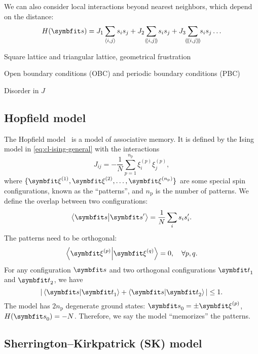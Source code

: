 We can also consider local interactions beyond nearest neighbors, which depend on the distance:
\begin{equation}
H(\vs) = J_1 \sum_{\langle i, j \rangle} s_i s_j + J_2\!\sum_{\llangle i, j \rrangle}\!s_i s_j + J_3\!\!\sum_{\langle\!\langle\!\langle i, j \rangle\!\rangle\!\rangle}\!\!s_i s_j \ldots
\label{eq:cl-ising-nnn}
\end{equation}

Square lattice and triangular lattice, geometrical frustration

Open boundary conditions (OBC) and periodic boundary conditions (PBC)

Disorder in $J$

\subsection{Hopfield model}

The Hopfield model~\cite{hopfield1982neural, amit1985spin} is a model of associative memory. It is defined by the Ising model in \cref{eq:cl-ising-general} with the interactions
\begin{equation}
J_{i j} = -\frac{1}{N} \sum_{p = 1}^{n_\text{p}} \xi^{(p)}_i \xi^{(p)}_j,
\label{eq:hopfield}
\end{equation}
where $\{\vxi^{(1)}, \vxi^{(2)}, \ldots, \vxi^{(n_\text{p})}\}$ are some special spin configurations, known as the ``patterns'', and $n_\text{p}$ is the number of patterns. We define the overlap between two configurations:
\begin{equation}
\ip{\vs}{\vs'} = \frac{1}{N} \sum_i s_i s'_i.
\label{eq:cl-overlap}
\end{equation}
The patterns need to be orthogonal:
\begin{equation}
\ip{\vxi^{(p)}}{\vxi^{(q)}} = 0, \quad \forall p, q.
\label{eq:cl-ortho}
\end{equation}
For any configuration $\vs$ and two orthogonal configurations $\vt_1$ and $\vt_2$, we have
\begin{equation}
|\ip{\vs}{\vt_1} + \ip{\vs}{\vt_2}| \le 1.
\end{equation}
The model has $2 n_\text{p}$ degenerate ground states: $\vs_0 = \pm \vxi^{(p)}$, $H(\vs_0) = -N$. Therefore, we say the model ``memorizes'' the patterns.

\subsection{Sherrington--Kirkpatrick (SK) model}
\label{sec:sk}

